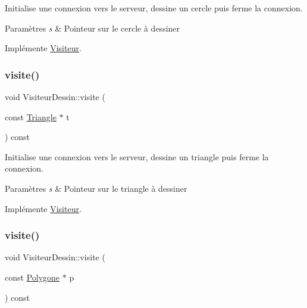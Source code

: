 Initialise une connexion vers le serveur, dessine un cercle puis ferme la connexion. 


\begin{DoxyParams}{Paramètres}
{\em s} & Pointeur sur le cercle à dessiner \\
\hline
\end{DoxyParams}


Implémente \mbox{\hyperlink{class_visiteur_a0af8611572f009ff37b9429facc7eaec}{Visiteur}}.

\mbox{\label{class_visiteur_dessin_a8278a3991c52c9d00e5ad5a051faacfe}} 
\subsubsection{\texorpdfstring{visite()}{visite()}\hspace{0.1cm}{\footnotesize\ttfamily [3/5]}}
{\footnotesize\ttfamily void Visiteur\+Dessin\+::visite (\begin{DoxyParamCaption}\item[{const \mbox{\hyperlink{class_triangle}{Triangle}} $\ast$}]{t }\end{DoxyParamCaption}) const\hspace{0.3cm}{\ttfamily [virtual]}}



Initialise une connexion vers le serveur, dessine un triangle puis ferme la connexion. 


\begin{DoxyParams}{Paramètres}
{\em s} & Pointeur sur le triangle à dessiner \\
\hline
\end{DoxyParams}


Implémente \mbox{\hyperlink{class_visiteur_a65332165fada93947fbad9a4d9eebf2c}{Visiteur}}.

\mbox{\label{class_visiteur_dessin_a59ef1f9a400906300fa4e6d3c1ec0ea1}} 
\subsubsection{\texorpdfstring{visite()}{visite()}\hspace{0.1cm}{\footnotesize\ttfamily [4/5]}}
{\footnotesize\ttfamily void Visiteur\+Dessin\+::visite (\begin{DoxyParamCaption}\item[{const \mbox{\hyperlink{class_polygone}{Polygone}} $\ast$}]{p }\end{DoxyParamCaption}) const\hspace{0.3cm}{\ttfamily [virtual]}}



